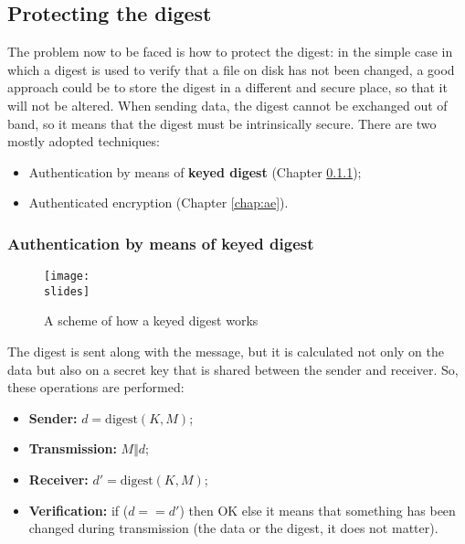 \subsection{Protecting the digest}
The problem now to be faced is how to protect the digest: in the simple case in which a digest is used to verify
that a file on disk has not been changed, a good approach could be to store the digest in a different and secure
place, so that it will not be altered. When sending data, the digest cannot be exchanged out of band, so it means
that the digest must be intrinsically secure. There are two mostly adopted techniques:
\begin{itemize}
    \item Authentication by means of \textbf{keyed digest} (Chapter \ref{chap:keyed_digest});
    \item Authenticated encryption (Chapter \ref{chap:ae}).
\end{itemize}

\subsubsection{Authentication by means of keyed digest}\label{chap:keyed_digest}
\begin{figure}[h]
    \centering
    \texttt{[image: \\slides]}
    \caption{A scheme of how a keyed digest works}
\end{figure}
The digest is sent along with the message, but it is calculated not only on the data but also on a secret key that is shared between the sender and receiver. So, these operations are performed:
\begin{itemize}
    \item \textbf{Sender:} \(d = \text{digest}(K, M)\);
    \item \textbf{Transmission:} \(M \Vert d\);
    \item \textbf{Receiver:} \(d' = \text{digest}(K, M)\);
    \item \textbf{Verification:} if (\(d == d'\)) then OK else it means that something has been changed during transmission (the data or the digest, it does not matter).
\end{itemize}

